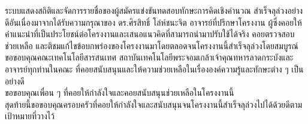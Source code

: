 ระบบแสดงสถิติและจัดการรายชื่อของผู้สมัครแข่งขันทดสอบทักษะการคิดเชิงคำนวณ สำเร็จลุล่วงอย่างดีอันเนื่องมาจากได้รับความกรุณาของ ดร.ศิรสิทธิ์ โล่ห์ชนะจิต อาจารย์ที่ปรึกษาโครงงาน ผู้ซึ่งคอยให้คำแนะนำที่เป็นประโยชน์ต่อโครงงานและเสนอแนวคิดที่สามารถนำมาปรับใช้ได้จริง คอยตรวจสอบ ช่วยเหลือ และติชมแก้ไขข้อบกพร่องของโครงงานมาโดยตลอดจนโครงงานนี้สำเร็จลุล่วงโดยสมบูรณ์
ขอขอบคุณคณะเทคโนโลยีสารสนเทศ สถาบันเทคโนโลยีพระจอมเกล้าเจ้าคุณทหารลาดกระบังและอาจารย์ทุกท่านในคณะ ที่คอยสนับสนุนและให้ความช่วยเหลือในเรื่ององค์ความรู้และทักษะต่าง ๆ เป็นอย่างดี \\
ขอขอบคุณเพื่อน ๆ ที่คอยให้กำลังใจและคอยสนับสนุนช่วยเหลือในโครงงานนี้ \\
สุดท้ายนี้ขอขอบคุณครอบครัวที่คอยให้กำลังใจและสนับสนุนจนโครงงานนี้สำเร็จลุล่วงไปได้ด้วยดีตามเป้าหมายที่วางไว้ \\